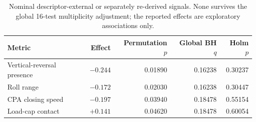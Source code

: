 \begin{table}[!htbp]
\centering
\small
\setlength{\tabcolsep}{5pt}
\renewcommand{\arraystretch}{1.05}
\caption{Nominal descriptor-external or separately re-derived signals.
None survives the global 16-test multiplicity adjustment; the reported
effects are exploratory associations only.}
\label{tab:multiplicity}
\begin{tabular}{@{}lrrrr@{}}
\toprule
Metric & Effect & Permutation $p$ & Global BH $q$ & Holm $p$ \\
\midrule
Vertical-reversal presence & $-0.244$ & 0.01890 & 0.16238 & 0.30237 \\
Roll range                 & $-0.172$ & 0.02030 & 0.16238 & 0.30447 \\
CPA closing speed          & $-0.197$ & 0.03940 & 0.18478 & 0.55154 \\
Load-cap contact           & $+0.141$ & 0.04620 & 0.18478 & 0.60054 \\
\bottomrule
\end{tabular}
\end{table}
